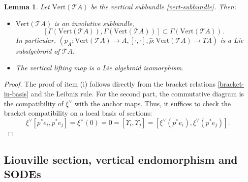 \documentclass[12pt,letterpaper]{article}
\renewcommand{\hat}{\widehat}
\newtheorem{lemma}[theorem]{Lemma}
\numberwithin{equation}{section}
\begin{document}
\begin{lemma}\label{Propvertical}
Let $\mathrm{Vert}(\mathcal{T} A ) $ be the vertical subbundle \eqref{vert-subbundle}. Then:
\begin{itemize}
\item[(i)] $\mathrm{Vert}(\mathcal{T} A ) $ is an involutive subbundle,
$$ [\Gamma(\mathrm{Vert}(\mathcal{T} A ) ), \Gamma(\mathrm{Vert}(\mathcal{T} A ) )] \subset \Gamma(\mathrm{Vert}(\mathcal{T} A ) ). $$
In particular, 
$ ( p_A : \mathrm{Vert}(\mathcal{T} A ) \rightarrow A, [ \cdot , \cdot ],  \hat{\rho} : \mathrm{Vert}(\mathcal{T} A ) \rightarrow TA ) $ 
is a Lie subalgebroid of $\mathcal{T}A$.
\item[(ii)] The vertical lifting map is a Lie algebroid isomorphism.
\end{itemize}
\end{lemma}
\begin{proof}
The proof of item (i) follows directly from the bracket relations \eqref{bracket-in-basis} and the Leibniz rule. 
For the second part, the commutative diagram is the compatibility of $\xi^\vee$ with the anchor maps.
Thus, it suffices to check the bracket compatibility on a local basis of sections:
\[
\xi^\vee[p^*e_i,p^*e_j] = \xi^\vee(0) = 0 = [\Upsilon_i,\Upsilon_j] = [\xi^\vee(p^*e_i),\xi^\vee(p^*e_j)].
\]
\end{proof}



\subsection{Liouville section, vertical endomorphism and SODEs}
\end{document}
